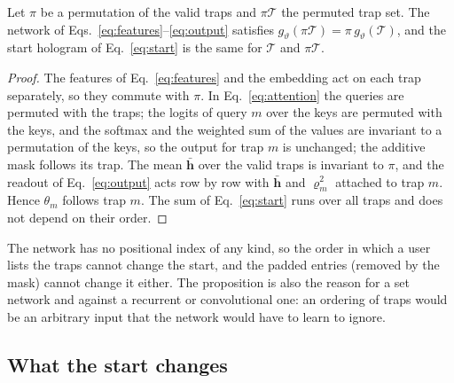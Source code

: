 \begin{proposition}\label{prop:equivariance}
Let $\pi$ be a permutation of the valid traps and $\pi\mathcal T$ the permuted trap set. The network of Eqs.~\eqref{eq:features}--\eqref{eq:output} satisfies $g_\vartheta(\pi\mathcal T)=\pi\,g_\vartheta(\mathcal T)$, and the start hologram of Eq.~\eqref{eq:start} is the same for $\mathcal T$ and $\pi\mathcal T$.
\end{proposition}
\begin{proof}
The features of Eq.~\eqref{eq:features} and the embedding act on each trap separately, so they commute with $\pi$. In Eq.~\eqref{eq:attention} the queries are permuted with the traps; the logits of query $m$ over the keys are permuted with the keys, and the softmax and the weighted sum of the values are invariant to a permutation of the keys, so the output for trap $m$ is unchanged; the additive mask follows its trap.
The mean $\bar{\mathbf h}$ over the valid traps is invariant to $\pi$, and the readout of Eq.~\eqref{eq:output} acts row by row with $\bar{\mathbf h}$ and $\varrho_m^2$ attached to trap $m$. Hence $\theta_m$ follows trap $m$. The sum of Eq.~\eqref{eq:start} runs over all traps and does not depend on their order. \end{proof}

The network has no positional index of any kind, so the order in which a user lists the traps cannot change the start, and the padded entries (removed by the mask) cannot change it either. The proposition is also the reason for a set network and against a recurrent or convolutional one: an ordering of traps would be an arbitrary input that the network would have to learn to ignore.

\subsection{What the start changes}\label{sec:start-change}

